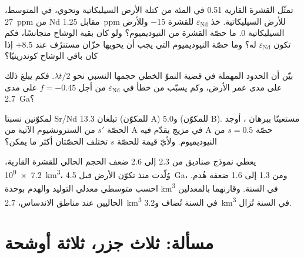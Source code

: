 \begin{exercise}[$\star\star$]\label{exo:b2:isotope-geochemistry:9}
تمثّل القشرة القارية 0.51 في المئة من كتلة الأرض السيليكاتية وتحوي،
في المتوسط، \qty{27}{ppm} من Nd مقابل \qty{1.25}{ppm} للأرض السيليكاتية. خذ
$\varepsilon_{\mathrm{Nd}}$ للقشرة $-15$ وللأرض السيليكاتية 0. ما
حصّة القشرة من النيوديميوم؟ ولو كان بقية الوشاح متجانسًا،
فكم تكون $\varepsilon_{\mathrm{Nd}}$ له؟ وما حصّة النيوديميوم التي يجب أن يحويها
خزّان مستنزَف عند $+8.5$ إذا كان باقي الوشاح كوندريتيًا؟
\end{exercise}

\begin{exercise}[$\star\star\star$]\label{exo:b2:isotope-geochemistry:10}
بيّن أن الحدود المهملة في قضية النموّ الخطي حجمها النسبي
نحو $\lambda t/2$. فكم يبلغ ذلك على مدى عمر الأرض، وكم
يسبّب من خطأ في $\varepsilon_{\mathrm{Nd}}$ من أجل $f = -0.45$ على مدى
\qty{2.7}{Ga}؟
\end{exercise}

\begin{exercise}[$\star\star\star$]\label{exo:b2:isotope-geochemistry:11}
لمكوّنين نسبتا Sr/Nd تبلغان 13.3 (للمكوّن A) و5.0 (للمكوّن B). مستعينًا ببرهان
، أوجد الحصّة $s'$ من السترونشيوم الآتية من A في مزيج يقدّم فيه A
حصّة $s = 0.5$ من النيوديميوم. ولأيّ قيمة للحصّة $s$ تختلف
الحصّتان أكثر ما يمكن؟
\end{exercise}

\begin{exercise}[$\star\star\star$]\label{exo:b2:isotope-geochemistry:12}
يعطي نموذج صناديق من 2.3 إلى 2.6 ضعف الحجم الحالي للقشرة القارية،
\qty{7.2e9}{km^3}، وُلّدت منذ تكوّن الأرض قبل \qty{4.5}{Ga}، ومن 1.3 إلى 1.6
ضعفه هُدم. احسب متوسطي معدلي التوليد والهدم بوحدة
\unit{km^3} في السنة. وقارنهما بالمعدلين الحاليين عند مناطق الاندساس،
\qty{2.7}{km^3} في السنة تُضاف و\qty{3.2}{km^3} في السنة تُزال.
\end{exercise}

\section{مسألة: ثلاث جزر، ثلاثة أوشحة}

